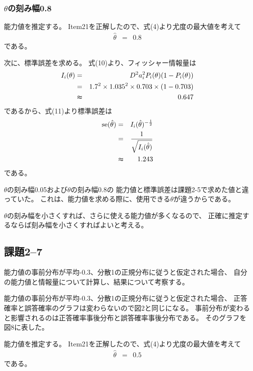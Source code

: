\documentclass[12pt]{jarticle}
\begin{document}
\clearpage
\subsubsection*{$\theta$の刻み幅0.8}
能力値を推定する。
Item21を正解したので、式(4)より尤度の最大値を考えて
\begin{eqnarray}
    \hat{\theta}&=&0.8 \nonumber
\end{eqnarray}
である。

次に、標準誤差を求める。
式(10)より、フィッシャー情報量は
\begin{eqnarray}
    I_i(\theta)&=&D^2a_i^2 P_i(\theta)(1-P_i(\theta)) \nonumber\\
    &=&1.7^2 \times 1.035^2\times 0.703\times (1-0.703) \nonumber\\
    &\thickapprox& 0.647 \nonumber
\end{eqnarray}
であるから、式(11)より標準誤差は
\begin{eqnarray}
    {\rm se}(\hat{\theta})&=&I_i(\hat{\theta})^{-\frac{1}{2}} \nonumber\\
    &=&\frac{1}{\sqrt{I_i(\hat{\theta})}}\nonumber\\
    &\thickapprox&1.243\nonumber
\end{eqnarray}
である。

$\theta$の刻み幅0.05および$\theta$の刻み幅0.8の
能力値と標準誤差は課題2-5で求めた値と違っていた。
これは、能力値を求める際に、使用できる$\theta$が違うからである。

$\theta$の刻み幅を小さくすれば、さらに使える能力値が多くなるので、
正確に推定するならば刻み幅を小さくすればよいと考える。

\clearpage
\subsection{課題2–7}
\begin{shadebox}
    能力値の事前分布が平均-0.3、分散1の正規分布に従うと仮定された場合、
    自分の能力値と情報量について計算し、結果について考察する。
\end{shadebox}
能力値の事前分布が平均-0.3、分散1の正規分布に従うと仮定された場合、
正答確率と誤答確率のグラフは変わらないので図2と同じになる。
事前分布が変わると影響されるのは正答確率事後分布と誤答確率事後分布である。
そのグラフを図8に表した。

能力値を推定する。
Item21を正解したので、式(4)より尤度の最大値を考えて
\begin{eqnarray}
    \hat{\theta}&=&0.5 \nonumber
\end{eqnarray}
である。
\end{document}
